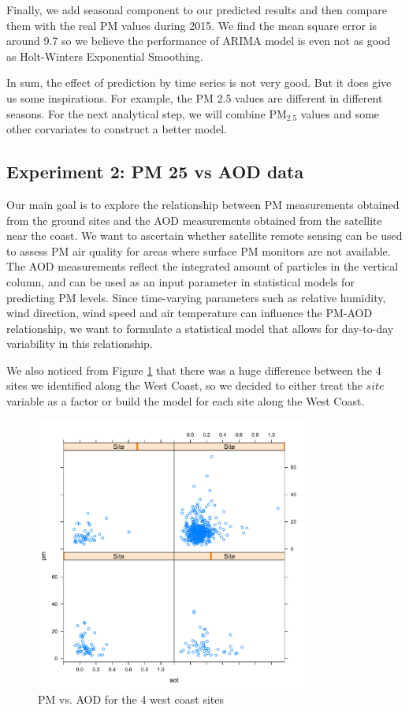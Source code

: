 \documentclass[10pt]{article}
\begin{document}
Finally, we add seasonal component to our predicted results and then compare them with the real PM values during 2015. We find the mean square error is around 9.7 so we believe the performance of ARIMA model is even not as good as Holt-Winters Exponential Smoothing.

In sum, the effect of prediction by time series is not very good. But it does give us some inspirations. For example, the PM 2.5 values are different in different seasons. For the next analytical step, we will combine PM$_{2.5}$ values and some other corvariates to construct a better model.

\subsection{Experiment 2: PM 25 vs AOD data}

Our main goal is to explore the relationship between PM measurements obtained from the ground sites and the AOD measurements obtained from the satellite near the coast. We want to ascertain whether satellite remote sensing can be used to assess PM air quality for areas where surface PM  monitors are not available. The AOD measurements reflect the integrated amount of particles in the vertical column, and can be used as an input parameter in statistical models for predicting PM levels. Since time-varying parameters such as relative humidity, wind direction, wind speed and air temperature can influence the PM-AOD relationship, we want to formulate a statistical model that allows for day-to-day variability in this relationship.  

We also noticed from Figure \ref{fig3.2.1} that there was a huge difference between the $4$ sites we identified along the West Coast, so we decided to either treat the $site$ variable as a factor or build the model for each site along the West Coast. 

\begin{figure}[!h]
\centering
\includegraphics[width = 90mm]{3.pdf}
\caption{PM vs. AOD for the 4 west coast sites}
\label{fig3.2.1}
\end{figure}
\end{document}
